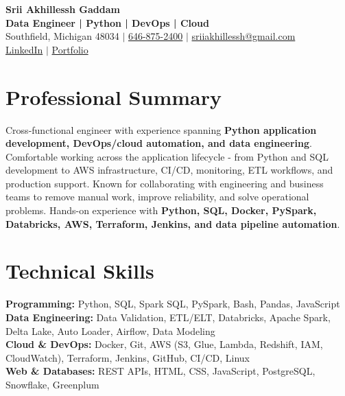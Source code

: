 \documentclass[letterpaper,10pt]{article}
\begin{document}
\fontsize{9.35pt}{10.45pt}\selectfont

\begin{center}
    {\LARGE \textbf{Srii Akhillessh Gaddam}} \\[-1pt]
    \textbf{Data Engineer | Python | DevOps | Cloud} \\[2pt]
    Southfield, Michigan 48034 $|$
    \href{tel:6468752400}{646-875-2400} $|$
    \href{mailto:sriiakhillessh@gmail.com}{sriiakhillessh@gmail.com} \\[1pt]
    \href{https://www.linkedin.com/in/srii-akhiilessh-gaddam-b48668191/}{LinkedIn} $|$
    \href{https://sriiakhillesshg.github.io/portfolio/}{Portfolio}
\end{center}
\vspace{-8pt}

\section{Professional Summary}
\small{Cross-functional engineer with experience spanning \textbf{Python application development, DevOps/cloud automation, and data engineering}. Comfortable working across the application lifecycle - from Python and SQL development to AWS infrastructure, CI/CD, monitoring, ETL workflows, and production support. Known for collaborating with engineering and business teams to remove manual work, improve reliability, and solve operational problems. Hands-on experience with \textbf{Python, SQL, Docker, PySpark, Databricks, AWS, Terraform, Jenkins, and data pipeline automation}.}

\section{Technical Skills}
\small{
\textbf{Programming:} Python, SQL, Spark SQL, PySpark, Bash, Pandas, JavaScript \\
\textbf{Data Engineering:} Data Validation, ETL/ELT, Databricks, Apache Spark, Delta Lake, Auto Loader, Airflow, Data Modeling \\
\textbf{Cloud \& DevOps:} Docker, Git, AWS (S3, Glue, Lambda, Redshift, IAM, CloudWatch), Terraform, Jenkins, GitHub, CI/CD, Linux \\
\textbf{Web \& Databases:} REST APIs, HTML, CSS, JavaScript, PostgreSQL, Snowflake, Greenplum
}

\end{document}
